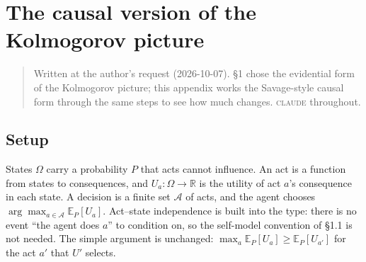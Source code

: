 \documentclass[11pt,a4paper]{article}
\newcommand{\CLAUDE}{\textnormal{\scshape claude}}
\begin{document}

\section{The causal version of the Kolmogorov picture}

\begin{quote}\small
Written at the author's request (2026-10-07). \S1 chose the evidential form of the Kolmogorov picture; this appendix works the Savage-style causal form through the same steps to see how much changes. \CLAUDE{} throughout.
\end{quote}

\subsection{Setup}
States $\Omega$ carry a probability $P$ that acts cannot influence. An act is a function from states to consequences, and $U_a : \Omega \to \mathbb R$ is the utility of act $a$'s consequence in each state. A decision is a finite set $\mathcal A$ of acts, and the agent chooses $\arg\max_{a \in \mathcal A} \mathbb E_P[ U_a]$. Act--state independence is built into the type: there is no event ``the agent does $a$'' to condition on, so the self-model convention of \S1.1 is not needed. The simple argument is unchanged: $\max_a \mathbb E_P[ U_a] \ge \mathbb E_P[ U_{a'}]$ for the act $a'$ that $U'$ selects.
\end{document}
